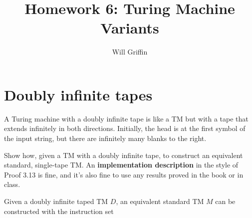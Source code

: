 \documentclass{article}
\title{Homework 6: Turing Machine Variants}
\author{Will Griffin}
\begin{document}
    \maketitle

    \section{Doubly infinite tapes}

    A Turing machine with a doubly infinite tape is like a TM but with a tape that extends infinitely in both directions. Initially, the head is at the first symbol of the input string, but there are infinitely many blanks to the right.

    Show how, given a TM with a doubly infinite tape, to construct an equivalent standard, single-tape TM. An \textbf{implementation description} in the style of Proof 3.13 is fine, and it's also fine to use any results proved in the book or in class.

    Given a doubly infinite taped TM $D$, an equivalent standard TM $M$ can be constructed with the instruction set
\end{document}
